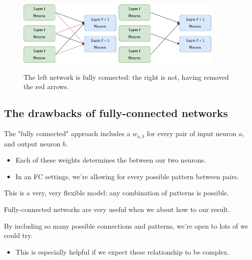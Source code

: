         \begin{figure}[H]
            \centering
            \includegraphics[width=50mm,scale=0.5]{images/convolutional_neural_networks_images/fully_connected.png}
            \qquad
            \includegraphics[width=50mm,scale=0.5]{images/convolutional_neural_networks_images/not_fully_connected.png}
            
            \caption*{The left network is fully connected: the right is not, having removed the red arrows.}
        \end{figure}

    \subsection{The drawbacks of fully-connected networks}
        
        The "fully connected" approach includes a  $w_{a,b}$ for every pair of input neuron $a$, and output neuron $b$.

        \begin{itemize}
            \item Each of these weights determines the  between our two neurons.
            \item In an FC settings, we're allowing for every possible pattern between pairs.
        \end{itemize}

        This is a very, very flexible model: any combination of patterns is possible. \\

        \begin{concept}
            Fully-connected networks are very useful when we  about how to  our result.

            By including so many possible connections and patterns, we're open to lots of  we could try.

            \begin{itemize}
                \item This is especially helpful if we expect these relationship to be complex.
            \end{itemize}
        \end{concept}


